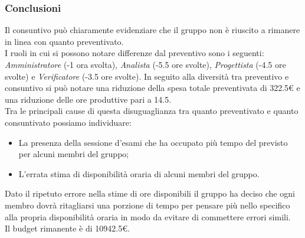 \subsubsection{Conclusioni}
Il consuntivo può chiaramente evidenziare che il gruppo non è riuscito a rimanere in linea con quanto preventivato.
\\I ruoli in cui si possono notare differenze dal preventivo sono i seguenti: \textit{Amministratore} (-1 ora svolta), \textit{Analista} (-5.5 ore svolte), \textit{Progettista} (-4.5 ore svolte) e \textit{Verificatore} (-3.5 ore svolte).
In seguito alla diversità tra preventivo e consuntivo si può notare una riduzione della spesa totale preventivata di 322.5€ e una riduzione delle ore produttive pari a 14.5.
\\Tra le principali cause di questa disuguaglianza tra quanto preventivato e quanto consuntivato possiamo individuare:
    \begin{itemize}
        \item La presenza della sessione d'esami che ha occupato più tempo del previsto per alcuni membri del gruppo;
        \item L'errata stima di disponibilità oraria di alcuni membri del gruppo.
    \end{itemize}
Dato il ripetuto errore nella stime di ore disponibili il gruppo ha deciso che ogni membro dovrà ritagliarsi una porzione di tempo per pensare più nello specifico alla propria disponibilità oraria in modo da evitare di commettere errori simili.
\\Il budget rimanente è di \num{10942.5}€.
